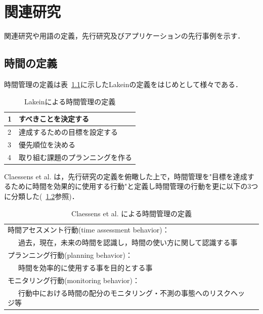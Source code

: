 \chapter{関連研究}
関連研究や用語の定義，先行研究及びアプリケーションの先行事例を示す．

\section{時間の定義}
時間管理の定義は表~\ref{tb:Lakein}に示したLakeinの定義\cite{Lakein1989}をはじめとして様々である．

\begin{table}[htb]
\begin{center}
  \begin{tabular}{|l|l|} \hline
   1 & すべきことを決定する \\ \hline
   2 & 達成するための目標を設定する \\ \hline
   3 & 優先順位を決める \\ \hline
   4 & 取り組む課題のプランニングを作る \\ \hline
  \end{tabular}
  \caption{Lakeinによる時間管理の定義}
  \label{tb:Lakein}
\end{center}
\end{table}

Claessens et al. は，先行研究の定義を俯瞰した上で，時間管理を"目標を達成するために時間を効果的に使用する行動"と定義し時間管理の行動を更に以下の3つに分類した\cite{Claessens2007}(~\ref{tb:Claessens}参照)．

\begin{table}[htb]
\begin{center}
  \begin{tabular}{|l|l|} \hline
   時間アセスメント行動(time assessment behavior)： \\ ~~~過去，現在，未来の時間を認識し，時間の使い方に関して認識する事 \\ \hline
   プランニング行動(planning behavior)：　\\  ~~~時間を効率的に使用する事を目的とする事 \\ \hline
   モニタリング行動(monitoring behavior)： \\ ~~~行動中における時間の配分のモニタリング・不測の事態へのリスクヘッジ等 \\ \hline
  \end{tabular}
  \caption{Claessens et al. による時間管理の定義}
  \label{tb:Claessens}
\end{center}
\end{table}


